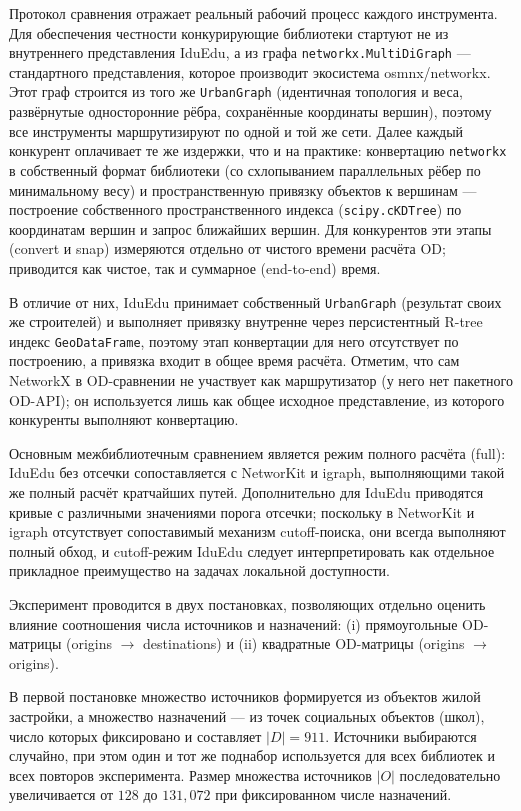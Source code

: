 \documentclass[sigconf,nonacm]{acmart}
\begin{document}
    Протокол сравнения отражает реальный рабочий процесс каждого инструмента.
    Для обеспечения честности конкурирующие библиотеки стартуют не из внутреннего представления IduEdu,
    а из графа \texttt{networkx.MultiDiGraph} — стандартного представления, которое производит экосистема osmnx/networkx.
    Этот граф строится из того же \texttt{UrbanGraph} (идентичная топология и веса, развёрнутые односторонние рёбра, сохранённые координаты вершин),
    поэтому все инструменты маршрутизируют по одной и той же сети.
    Далее каждый конкурент оплачивает те же издержки, что и на практике: конвертацию \texttt{networkx} в собственный формат библиотеки
    (со схлопыванием параллельных рёбер по минимальному весу) и пространственную привязку объектов к вершинам — построение
    собственного пространственного индекса (\texttt{scipy.cKDTree}) по координатам вершин и запрос ближайших вершин.
    Для конкурентов эти этапы (convert и snap) измеряются отдельно от чистого времени расчёта OD; приводится как чистое, так и суммарное (end-to-end) время.

    В отличие от них, IduEdu принимает собственный \texttt{UrbanGraph} (результат своих же строителей) и выполняет привязку внутренне через персистентный
    R-tree индекс \texttt{GeoDataFrame}, поэтому этап конвертации для него отсутствует по построению, а привязка входит в общее время расчёта.
    Отметим, что сам NetworkX в OD-сравнении не участвует как маршрутизатор (у него нет пакетного OD-API);
    он используется лишь как общее исходное представление, из которого конкуренты выполняют конвертацию.

    Основным межбиблиотечным сравнением является режим полного расчёта (full): IduEdu без отсечки сопоставляется
    с NetworKit и igraph, выполняющими такой же полный расчёт кратчайших путей.
    Дополнительно для IduEdu приводятся кривые с различными значениями порога отсечки; поскольку в NetworKit и igraph
    отсутствует сопоставимый механизм cutoff-поиска, они всегда выполняют полный обход, и cutoff-режим IduEdu
    следует интерпретировать как отдельное прикладное преимущество на задачах локальной доступности.

    Эксперимент проводится в двух постановках, позволяющих отдельно оценить влияние соотношения числа источников и назначений:
    (i) прямоугольные OD-матрицы (origins $\rightarrow$ destinations) и (ii) квадратные OD-матрицы (origins $\rightarrow$ origins).

    В первой постановке множество источников формируется из объектов жилой застройки,
    а множество назначений — из точек социальных объектов (школ), число которых фиксировано и составляет  $|D|=911$.
    Источники выбираются случайно, при этом один и тот же поднабор используется для всех библиотек и всех повторов эксперимента.
    Размер множества источников $|O|$ последовательно увеличивается от $128$ до $131{,}072$ при фиксированном числе назначений.
\end{document}
